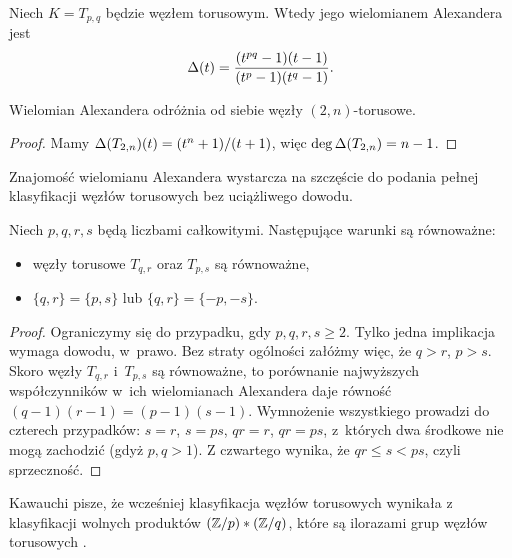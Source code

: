 \begin{corollary}
    Niech $K = T_{p, q}$ będzie węzłem torusowym.
    Wtedy jego wielomianem Alexandera jest
    \begin{equation}
         \Delta(t) = \frac{(t^{pq}-1)(t-1)}{(t^p-1)(t^q-1)}.
    \end{equation}
\end{corollary}

\begin{corollary}
\label{cor:alexander_distinguishes_torus}
    Wielomian Alexandera odróżnia od siebie węzły $(2,n)$-torusowe.
\end{corollary}

\begin{proof}
    Mamy $\Delta(T_{2,n})(t) = (t^n+1) / (t+1)$, więc $\deg \Delta (T_{2,n}) = n - 1$.
\end{proof}

Znajomość wielomianu Alexandera wystarcza na szczęście do podania pełnej klasyfikacji węzłów torusowych bez uciążliwego dowodu.

\begin{proposition}
    Niech $p, q, r, s$ będą liczbami całkowitymi.
    Następujące warunki są równoważne:
    \begin{itemize}
        \item węzły torusowe $T_{q, r}$ oraz $T_{p, s}$ są równoważne,
        \item $\{q, r\} = \{p, s\}$ lub $\{q, r\} = \{-p, -s\}$.
    \end{itemize}
\end{proposition}

\begin{proof}
    Ograniczymy się do przypadku, gdy $p, q, r, s \ge 2$.
    Tylko jedna implikacja wymaga dowodu, w~prawo.
    Bez straty ogólności załóżmy więc, że $q > r$, $p > s$.
    Skoro węzły $T_{q, r}$ i~$T_{p,s}$ są równoważne, to porównanie najwyższych współczynników w~ich wielomianach Alexandera daje równość $(q-1)(r-1) = (p-1)(s-1)$.
    Wymnożenie wszystkiego prowadzi do czterech przypadków: $s = r$, $s = ps$, $qr = r$, $qr = ps$, z~których dwa środkowe nie mogą zachodzić (gdyż $p, q > 1$).
    Z czwartego wynika, że $qr \le s < ps$, czyli sprzeczność.
\end{proof}

Kawauchi pisze, że wcześniej klasyfikacja węzłów torusowych wynikała z klasyfikacji wolnych produktów $(\mathbb Z/p) * (\mathbb Z/q)$, które są ilorazami grup węzłów torusowych \cite{schreier24}.

